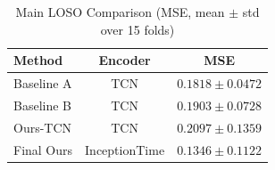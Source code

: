 \documentclass{article}
\begin{document}
\begin{table}[htbp]
\centering
\caption{Main LOSO Comparison (MSE, mean $\pm$ std over 15 folds)}
\label{tab:main_comparison}
\begin{tabular}{lcc}
\toprule
\textbf{Method} & \textbf{Encoder} & \textbf{MSE} \\
\midrule
Baseline A & TCN & $0.1818 \pm 0.0472$ \\
Baseline B & TCN & $0.1903 \pm 0.0728$ \\
Ours-TCN & TCN & $0.2097 \pm 0.1359$ \\
Final Ours & InceptionTime & $\mathbf{0.1346} \pm 0.1122$ \\
\bottomrule
\end{tabular}
\end{table}
\end{document}

